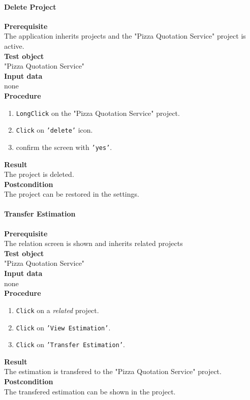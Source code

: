 \paragraph*{\textbf{Delete Project}}
\textbf{Prerequisite}\\
The application inherits projects and the "Pizza Quotation Service" project is active.\\
\textbf{Test object}\\
"Pizza Quotation Service"\\
\textbf{Input data}\\
none\\
\textbf{Procedure}
\begin{enumerate}
	\item \texttt{LongClick} on the "Pizza Quotation Service" project.
	\item \texttt{Click} on \texttt{'delete'} icon.
	\item confirm the screen with \texttt{'yes'}.
\end{enumerate}
\textbf{Result}\\
The project is deleted.\\
\textbf{Postcondition}\\
The project can be restored in the settings.
\paragraph*{\textbf{Transfer Estimation}}
\textbf{Prerequisite}\\
The relation screen is shown and inherits related projects\\
\textbf{Test object}\\
"Pizza Quotation Service"\\
\textbf{Input data}\\
none\\
\textbf{Procedure}
\begin{enumerate}
	\item \texttt{Click} on a \textit{related} project.
	\item \texttt{Click} on \texttt{'View Estimation'}.
	\item \texttt{Click} on \texttt{'Transfer Estimation'}.
\end{enumerate}
\textbf{Result}\\
The estimation is transfered to the "Pizza Quotation Service" project.\\
\textbf{Postcondition}\\
The transfered estimation can be shown in the project.
